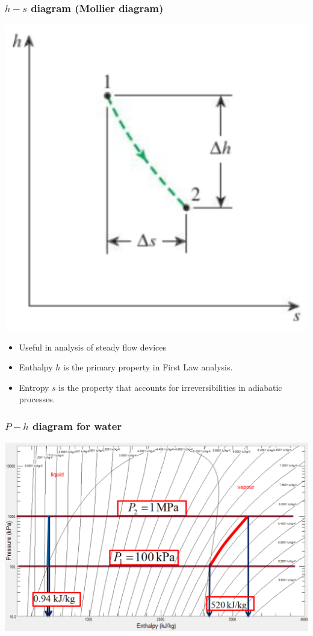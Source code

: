 \documentclass[11pt]{article}
\begin{document}
\subsubsection{\(h-s\) diagram (Mollier diagram)}
\label{sec:orgd70a361}
\begin{center}
\includegraphics[scale=1]{./images/h-s-diagram.png}
\end{center}

\begin{itemize}
\item Useful in analysis of steady flow devices
\item Enthalpy \(h\) is the primary property in First Law analysis.
\item Entropy \(s\) is the property that accounts for irreversibilities in adiabatic processes.
\end{itemize}

\subsubsection{\(P-h\) diagram for water}
\label{sec:orge59bc47}
\begin{center}
\includegraphics[width=.9\linewidth]{./images/P-h-diagram-for-water.png}
\end{center}
\end{document}
